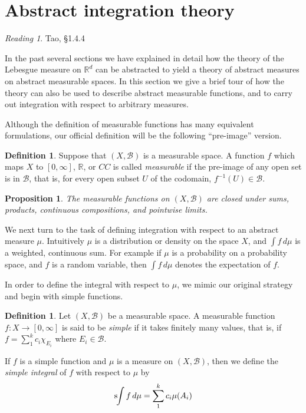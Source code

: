 \documentclass[11pt,oneside]{amsbook}
\newcommand{\RR}{{\mathbb R}}
\newcommand{\sint}{\text{s}\kern-3pt\int}
\theoremstyle{definition}
\theoremstyle{plain}
\newtheorem{prop}[thm]{Proposition}
\theoremstyle{definition}
\newtheorem{defn}[thm]{Definition}
\theoremstyle{remark}
\newtheorem*{reading}{Reading}
\numberwithin{equation}{section}
\numberwithin{figure}{section}
\begin{document}
\newpage
\section{Abstract integration theory}

\begin{reading}
  Tao, \S 1.4.4
\end{reading}

In the past several sections we have explained in detail how the theory of the Lebesgue measure on $\RR^d$ can be abstracted to yield a theory of abstract measures on abstract measurable spaces. In this section we give a brief tour of how the theory can also be used to describe abstract measurable functions, and to carry out integration with respect to arbitrary measures.

Although the definition of measurable functions has many equivalent formulations, our official definition will be the following ``pre-image'' version.

\begin{defn}
  Suppose that $(X,\mathcal B)$ is a measurable space. A function $f$ which maps $X$ to $[0,\infty]$, $\RR$, or $CC$ is called \emph{measurable} if the pre-image of any open set is in $\mathcal B$, that is, for every open subset $U$ of the codomain, $f^{-1}(U)\in\mathcal B$.
\end{defn}

\begin{prop}
  The measurable functions on $(X,\mathcal B)$ are closed under sums, products, continuous compositions, and pointwise limits.
\end{prop}

We next turn to the task of defining integration with respect to an abstract measure $\mu$. Intuitively $\mu$ is a distribution or density on the space $X$, and $\int f\,d\mu$ is a weighted, continuous sum. For example if $\mu$ is a probability on a probability space, and $f$ is a random variable, then $\int f\,d\mu$ denotes the expectation of $f$.

In order to define the integral with respect to $\mu$, we mimic our original strategy and begin with simple functions.

\begin{defn}
  Let $(X,\mathcal B)$ be a measurable space. A measurable function $f\colon X\to[0,\infty]$ is said to be \emph{simple} if it takes finitely many values, that is, if $f=\sum_1^kc_i\chi_{E_i}$ where $E_i\in\mathcal B$.

  If $f$ is a simple function and $\mu$ is a measure on $(X,\mathcal B)$, then we define the \emph{simple integral} of $f$ with respect to $\mu$ by
  \[\sint f\,d\mu=\sum_1^kc_i\mu(A_i)
  \]
\end{defn}
\end{document}
